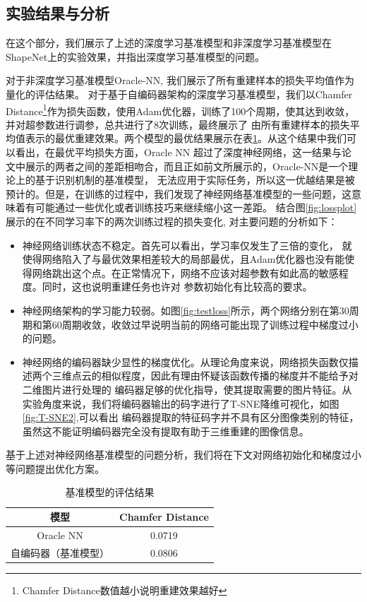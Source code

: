 \documentclass[bachelor, nocolorlinks, printoneside]{seuthesis} %
\begin{document}
\begin{Main}
\subsection{实验结果与分析}

在这个部分，我们展示了上述的深度学习基准模型和非深度学习基准模型在ShapeNet上的实验效果，并指出深度学习基准模型的问题。

对于非深度学习基准模型Oracle-NN, 我们展示了所有重建样本的损失平均值作为量化的评估结果。
对于基于自编码器架构的深度学习基准模型，我们以Chamfer Distance\footnote[2]{Chamfer Distance数值越小说明重建效果越好}作为损失函数，使用Adam优化器，训练了100个周期，使其达到收敛，并对超参数进行调参，总共进行了8次训练，最终展示了
由所有重建样本的损失平均值表示的最优重建效果。两个模型的最优结果展示在表\ref{table:metric_per_baseline}。从这个结果中我们可以看出，在最优平均损失方面，Oracle NN
超过了深度神经网络，这一结果与论文\cite{tatarchenko2019single}中展示的两者之间的差距相吻合，而且正如前文所展示的，Oracle-NN是一个理论上的基于识别机制的基准模型，
无法应用于实际任务，所以这一优越结果是被预计的。但是，在训练的过程中，我们发现了神经网络基准模型的一些问题，这意味着有可能通过一些优化或者训练技巧来继续缩小这一差距。
结合图\ref{fig:lossplot}展示的在不同学习率下的两次训练过程的损失变化, 对主要问题的分析如下：
\begin{itemize}
    \item 神经网络训练状态不稳定。首先可以看出，学习率仅发生了三倍的变化，
        就使得网络陷入了与最优效果相差较大的局部最优，且Adam优化器也没有能使得网络跳出这个点。在正常情况下，网络不应该对超参数有如此高的敏感程度。同时，这也说明重建任务也许对
        参数初始化有比较高的要求。
    \item 神经网络架构的学习能力较弱。如图\ref{fig:testloss}所示，两个网络分别在第30周期和第60周期收敛，收敛过早说明当前的网络可能出现了训练过程中梯度过小的问题。
    \item 神经网络的编码器缺少显性的梯度优化。从理论角度来说，网络损失函数仅描述两个三维点云的相似程度，因此有理由怀疑该函数传播的梯度并不能给予对二维图片进行处理的
    编码器足够的优化指导，使其提取需要的图片特征。从实验角度来说，我们将编码器输出的码字进行了T-SNE降维可视化，如图\ref{fig:T-SNE2},可以看出
    编码器提取的特征码字并不具有区分图像类别的特征，虽然这不能证明编码器完全没有提取有助于三维重建的图像信息。
\end{itemize}

基于上述对神经网络基准模型的问题分析，我们将在下文对网络初始化和梯度过小等问题提出优化方案。
\begin{table}
    \centering
    \caption{基准模型的评估结果}
    \label{table:metric_per_baseline}
    \begin{tabular}{cc} 
    \hline
    模型         & Chamfer Distance        \\ 
    \hline
    Oracle NN  & 0.0719                  \\
    自编码器（基准模型） & 0.0806 \\
    \hline
    \end{tabular}
\end{table}


\end{Main}
\end{document}
